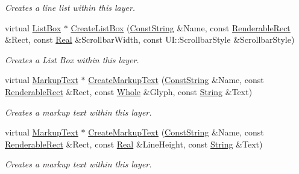 \begin{DoxyCompactItemize}
\begin{DoxyCompactList}\small\item\em Creates a line list within this layer. \item\end{DoxyCompactList}\item 
virtual \hyperlink{classphys_1_1UI_1_1ListBox}{ListBox} $\ast$ \hyperlink{classphys_1_1UI_1_1Layer_a9bb957261e17e11ed7a320d8ba10f9c6}{CreateListBox} (\hyperlink{namespacephys_a5ce5049f8b4bf88d6413c47b504ebb31}{ConstString} \&Name, const \hyperlink{structphys_1_1UI_1_1RenderableRect}{RenderableRect} \&Rect, const \hyperlink{namespacephys_af7eb897198d265b8e868f45240230d5f}{Real} \&ScrollbarWidth, const UI::ScrollbarStyle \&ScrollbarStyle)
\begin{DoxyCompactList}\small\item\em Creates a List Box within this layer. \item\end{DoxyCompactList}\item 
virtual \hyperlink{classphys_1_1UI_1_1MarkupText}{MarkupText} $\ast$ \hyperlink{classphys_1_1UI_1_1Layer_a62338ca48dce418a53c4d9d027152a4c}{CreateMarkupText} (\hyperlink{namespacephys_a5ce5049f8b4bf88d6413c47b504ebb31}{ConstString} \&Name, const \hyperlink{structphys_1_1UI_1_1RenderableRect}{RenderableRect} \&Rect, const \hyperlink{namespacephys_a460f6bc24c8dd347b05e0366ae34f34a}{Whole} \&Glyph, const \hyperlink{namespacephys_aa03900411993de7fbfec4789bc1d392e}{String} \&Text)
\begin{DoxyCompactList}\small\item\em Creates a markup text within this layer. \item\end{DoxyCompactList}\item 
virtual \hyperlink{classphys_1_1UI_1_1MarkupText}{MarkupText} $\ast$ \hyperlink{classphys_1_1UI_1_1Layer_a556d60552d49483bda837b27fcb0f985}{CreateMarkupText} (\hyperlink{namespacephys_a5ce5049f8b4bf88d6413c47b504ebb31}{ConstString} \&Name, const \hyperlink{structphys_1_1UI_1_1RenderableRect}{RenderableRect} \&Rect, const \hyperlink{namespacephys_af7eb897198d265b8e868f45240230d5f}{Real} \&LineHeight, const \hyperlink{namespacephys_aa03900411993de7fbfec4789bc1d392e}{String} \&Text)
\begin{DoxyCompactList}\small\item\em Creates a markup text within this layer. \item\end{DoxyCompactList}\item 

\end{DoxyCompactItemize}
